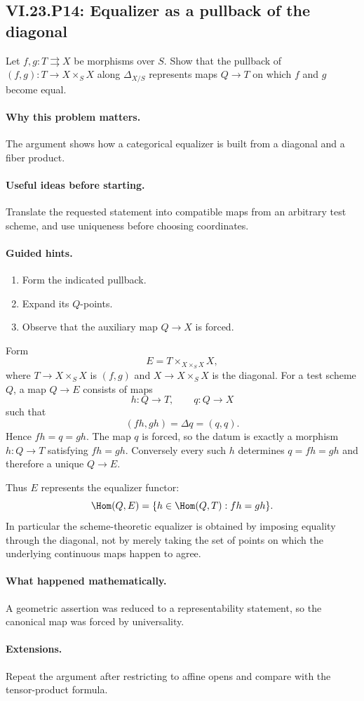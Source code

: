 \subsection*{VI.23.P14: Equalizer as a pullback of the diagonal}
\begin{problem}\label{prob:vi23-p14}
Let $f,g:T\rightrightarrows X$ be morphisms over $S$. Show that the pullback of
$(f,g):T\to X\times_SX$ along $\Delta_{X/S}$ represents maps $Q\to T$ on which $f$ and $g$
become equal.
\end{problem}

\ifdefined\FullProblemDossiers
\paragraph{Why this problem matters.}
The argument shows how a categorical equalizer is built from a diagonal and a fiber product.

\paragraph{Useful ideas before starting.}
Translate the requested statement into compatible maps from an arbitrary test scheme, and use uniqueness before choosing coordinates.

\paragraph{Guided hints.}
\begin{enumerate}
\item Form the indicated pullback.
\item Expand its $Q$-points.
\item Observe that the auxiliary map $Q\to X$ is forced.
\end{enumerate}

\begin{solution}
Form
\[
E=T\times_{X\times_SX}X,
\]
where $T\to X\times_SX$ is $(f,g)$ and $X\to X\times_SX$ is the diagonal.  For a test scheme
$Q$, a map $Q\to E$ consists of maps
\[
h:Q\to T,\qquad q:Q\to X
\]
such that
\[
(fh,gh)=\Delta q=(q,q).
\]
Hence $fh=q=gh$.  The map $q$ is forced, so the datum is exactly a morphism
$h:Q\to T$ satisfying $fh=gh$.  Conversely every such $h$ determines $q=fh=gh$ and therefore
a unique $Q\to E$.

Thus $E$ represents the equalizer functor:
\[
\Hom(Q,E)=\{h\in\Hom(Q,T):fh=gh\}.
\]
In particular the scheme-theoretic equalizer is obtained by imposing equality through the
diagonal, not by merely taking the set of points on which the underlying continuous maps happen
to agree.
\end{solution}

\paragraph{What happened mathematically.}
A geometric assertion was reduced to a representability statement, so the canonical map was forced by universality.

\paragraph{Extensions.}
Repeat the argument after restricting to affine opens and compare with the tensor-product formula.
\fi
